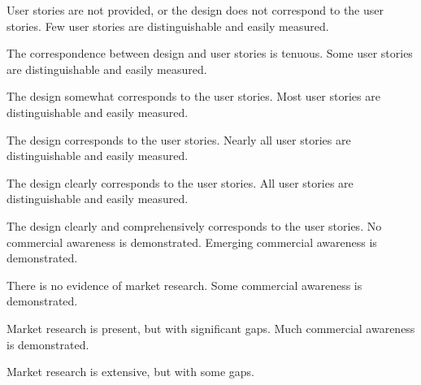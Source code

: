 \documentclass{../fal_assignment}
\begin{document}
\begin{markingrubric}
        \grade\fail User stories are not provided, or the design does not correspond to the user stories.
        \grade Few user stories are distinguishable and easily measured.
            \par The correspondence between design and user stories is tenuous.
        \grade Some user stories are distinguishable and easily measured.
            \par The design somewhat corresponds to the user stories.
        \grade Most user stories are distinguishable and easily measured.
            \par The design corresponds to the user stories.
        \grade Nearly all user stories are distinguishable and easily measured.
            \par The design clearly corresponds to the user stories.
        \grade All user stories are distinguishable and easily measured.
            \par The design clearly and comprehensively corresponds to the user stories.
        \grade\fail No commercial awareness is demonstrated.
        \grade Emerging commercial awareness is demonstrated.
            \par There is no evidence of market research.
        \grade Some commercial awareness is demonstrated.
            \par Market research is present, but with significant gaps.
        \grade Much commercial awareness is demonstrated.
            \par Market research is extensive, but with some gaps.

\end{markingrubric}
\end{document}
